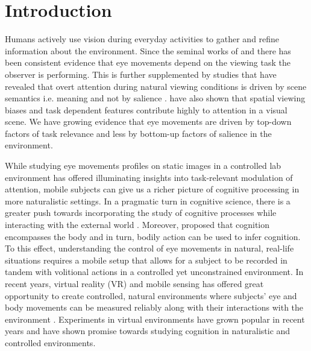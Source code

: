 \section{Introduction}

Humans actively use vision during everyday activities to gather and refine information about the environment. Since the seminal works of \citet{Yarbus2013-eu} and \citet{Buswell1935-di} there has been consistent evidence that eye movements depend on the viewing task the observer is performing. This is further supplemented by studies that have revealed that overt attention during natural viewing conditions is driven by scene semantics i.e. meaning and not by salience \citep{Henderson2017-it}. \citet{Kollmorgen2010-wg} have also shown that spatial viewing biases and task dependent features contribute highly to attention in a visual scene. We have growing evidence that eye movements are driven by top-down factors of task relevance and less by bottom-up factors of salience in the environment.

While studying eye movements profiles on static images in a controlled lab environment has offered illuminating insights into task-relevant modulation of attention, mobile subjects can give us a richer picture of cognitive processing in more naturalistic settings. In a pragmatic turn in cognitive science, there is a greater push towards incorporating the study of cognitive processes while interacting with the external world \citet{Parada2020-qq}. Moreover, \citet{Engel2013-bx} proposed that cognition encompasses the body and in turn, bodily action can be used to infer cognition. To this effect, understanding the control of eye movements in natural, real-life situations requires a mobile setup that allows for a subject to be recorded in tandem with volitional actions in a controlled yet unconstrained environment. In recent years, virtual reality (VR) and mobile sensing has offered great opportunity to create controlled, natural environments where subjects' eye and body movements can be measured reliably along with their interactions with the environment \citep{Keshava2020-cp, Clay2019-cu, Mann2019-ls}. Experiments in virtual environments have grown popular in recent years and have shown promise towards studying cognition in naturalistic and controlled environments.

